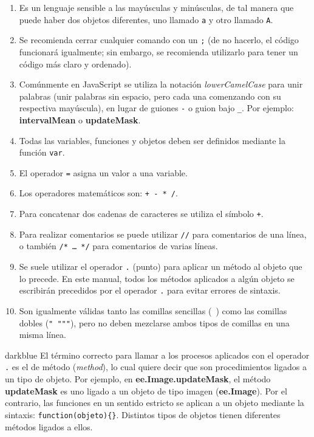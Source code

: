 \documentclass[
  12pt,
  letterpaper,
  twoside]{book}
\providecommand{\tightlist}{%
  \setlength{\itemsep}{0pt}\setlength{\parskip}{0pt}}
\newcommand\boldpurple[1]{\textcolor{darkpurple}{\textbf{#1}}}
\begin{document}
\begin{enumerate}
\def\labelenumi{\arabic{enumi}.}
\tightlist
\item
  Es un lenguaje sensible a las mayúsculas y minúsculas, de tal manera que puede haber dos objetos diferentes, uno llamado \texttt{a} y otro llamado \texttt{A}.
\item
  Se recomienda cerrar cualquier comando con un \texttt{;} (de no hacerlo, el código funcionará igualmente; sin embargo, se recomienda utilizarlo para tener un código más claro y ordenado).
\item
  Comúnmente en JavaScript se utiliza la notación \emph{lowerCamelCase} para unir palabras (unir palabras sin espacio, pero cada una comenzando con su respectiva mayúscula), en lugar de guiones \texttt{-} o guion bajo \texttt{\_}. Por ejemplo: \boldpurple{intervalMean} o \boldpurple{updateMask}.
\item
  Todas las variables, funciones y objetos deben ser definidos mediante la función \texttt{var}.
\item
  El operador \texttt{=} asigna un valor a una variable.
\item
  Los operadores matemáticos son: \texttt{+\ -\ *\ /}.
\item
  Para concatenar dos cadenas de caracteres se utiliza el símbolo \texttt{+}.
\item
  Para realizar comentarios se puede utilizar \texttt{//} para comentarios de una línea, o también \texttt{/*\ …\ */} para comentarios de varias líneas.
\item
  Se suele utilizar el operador \texttt{.} (punto) para aplicar un método al objeto que lo precede. En este manual, todos los métodos aplicados a algún objeto se escribirán precedidos por el operador \texttt{.} para evitar errores de sintaxis.
\item
  Son igualmente válidas tanto las comillas sencillas (\texttt{\textquotesingle{}\ \textquotesingle{}}) como las comillas dobles (\texttt{"\ """}), pero no deben mezclarse ambos tipos de comillas en una misma línea.
\end{enumerate}

\begin{bluebox2}

\begin{awesomeblock}{5pt}{\faLightbulb}{darkblue}
El término correcto para llamar a los procesos aplicados con el operador \texttt{.} es el de método (\emph{method}), lo cual quiere decir que son procedimientos ligados a un tipo de objeto. Por ejemplo, en \boldpurple{ee.Image.updateMask}, el método \boldpurple{updateMask} es uno ligado a un objeto de tipo imagen (\boldpurple{ee.Image}). Por el contrario, las funciones en un sentido estricto se aplican a un objeto mediante la sintaxis: \texttt{function(objeto)\{\}}. Distintos tipos de objetos tienen diferentes métodos ligados a ellos.

\end{awesomeblock}

\end{bluebox2}
\end{document}
